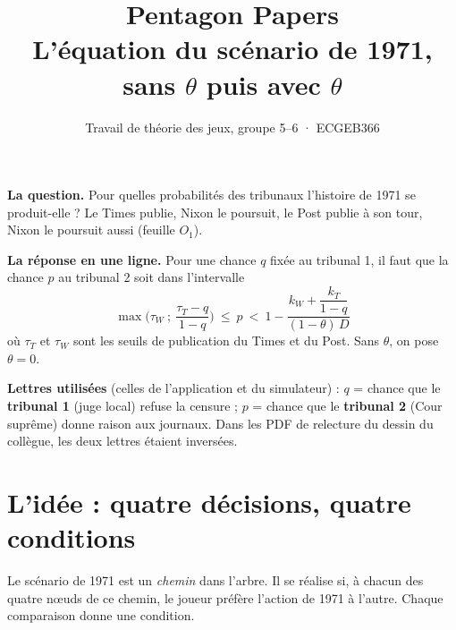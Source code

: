 \documentclass[11pt,a4paper]{article}
\title{\textbf{Pentagon Papers}\\[3pt]\large L'équation du scénario de 1971, sans $\theta$ puis avec $\theta$}
\author{Travail de théorie des jeux, groupe 5--6 · ECGEB366}
\date{}
\theoremstyle{definition}
\begin{document}
\maketitle
\vspace{-1.2cm}

\begin{resultat}
\textbf{La question.} Pour quelles probabilités des tribunaux l'histoire de 1971 se produit-elle ? Le Times publie, Nixon le poursuit, le Post publie à son tour, Nixon le poursuit aussi (feuille $O_1$).

\textbf{La réponse en une ligne.} Pour une chance $q$ fixée au tribunal 1, il faut que la chance $p$ au tribunal 2 soit dans l'intervalle
\[
\boxed{\ \max\!\Big(\tau_W\ ;\ \frac{\tau_T-q}{1-q}\Big)\ \le\ p\ <\ 1-\frac{k_W+\dfrac{k_T}{1-q}}{(1-\theta)\,D}\ }
\]
où $\tau_T$ et $\tau_W$ sont les seuils de publication du Times et du Post. Sans $\theta$, on pose $\theta=0$.
\end{resultat}

\begin{discuter}
\textbf{Lettres utilisées} (celles de l'application et du simulateur) : $q$ = chance que le \textbf{tribunal 1} (juge local) refuse la censure ; $p$ = chance que le \textbf{tribunal 2} (Cour suprême) donne raison aux journaux. Dans les PDF de relecture du dessin du collègue, les deux lettres étaient inversées.
\end{discuter}

\section{L'idée : quatre décisions, quatre conditions}

Le scénario de 1971 est un \emph{chemin} dans l'arbre. Il se réalise si, à chacun des quatre nœuds de ce chemin, le joueur préfère l'action de 1971 à l'autre. Chaque comparaison donne une condition.
\end{document}
